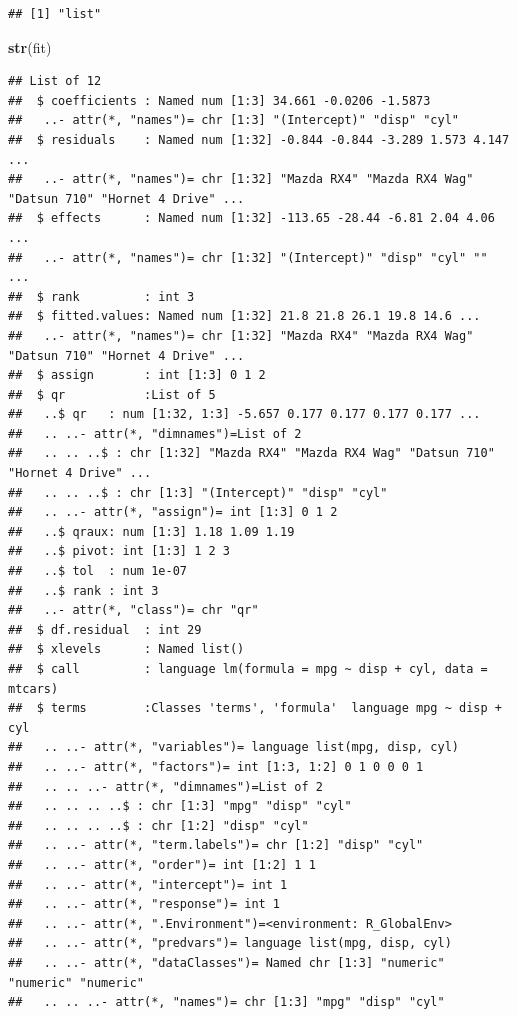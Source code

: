 \documentclass[]{book}
\newenvironment{Shaded}{\begin{snugshade}}{\end{snugshade}}
\newcommand{\KeywordTok}[1]{\textcolor[rgb]{0.13,0.29,0.53}{\textbf{#1}}}
\newcommand{\NormalTok}[1]{#1}
\begin{document}
\begin{verbatim}
## [1] "list"
\end{verbatim}

\begin{Shaded}
\begin{Highlighting}[]
\KeywordTok{str}\NormalTok{(fit)}
\end{Highlighting}
\end{Shaded}

\begin{verbatim}
## List of 12
##  $ coefficients : Named num [1:3] 34.661 -0.0206 -1.5873
##   ..- attr(*, "names")= chr [1:3] "(Intercept)" "disp" "cyl"
##  $ residuals    : Named num [1:32] -0.844 -0.844 -3.289 1.573 4.147 ...
##   ..- attr(*, "names")= chr [1:32] "Mazda RX4" "Mazda RX4 Wag" "Datsun 710" "Hornet 4 Drive" ...
##  $ effects      : Named num [1:32] -113.65 -28.44 -6.81 2.04 4.06 ...
##   ..- attr(*, "names")= chr [1:32] "(Intercept)" "disp" "cyl" "" ...
##  $ rank         : int 3
##  $ fitted.values: Named num [1:32] 21.8 21.8 26.1 19.8 14.6 ...
##   ..- attr(*, "names")= chr [1:32] "Mazda RX4" "Mazda RX4 Wag" "Datsun 710" "Hornet 4 Drive" ...
##  $ assign       : int [1:3] 0 1 2
##  $ qr           :List of 5
##   ..$ qr   : num [1:32, 1:3] -5.657 0.177 0.177 0.177 0.177 ...
##   .. ..- attr(*, "dimnames")=List of 2
##   .. .. ..$ : chr [1:32] "Mazda RX4" "Mazda RX4 Wag" "Datsun 710" "Hornet 4 Drive" ...
##   .. .. ..$ : chr [1:3] "(Intercept)" "disp" "cyl"
##   .. ..- attr(*, "assign")= int [1:3] 0 1 2
##   ..$ qraux: num [1:3] 1.18 1.09 1.19
##   ..$ pivot: int [1:3] 1 2 3
##   ..$ tol  : num 1e-07
##   ..$ rank : int 3
##   ..- attr(*, "class")= chr "qr"
##  $ df.residual  : int 29
##  $ xlevels      : Named list()
##  $ call         : language lm(formula = mpg ~ disp + cyl, data = mtcars)
##  $ terms        :Classes 'terms', 'formula'  language mpg ~ disp + cyl
##   .. ..- attr(*, "variables")= language list(mpg, disp, cyl)
##   .. ..- attr(*, "factors")= int [1:3, 1:2] 0 1 0 0 0 1
##   .. .. ..- attr(*, "dimnames")=List of 2
##   .. .. .. ..$ : chr [1:3] "mpg" "disp" "cyl"
##   .. .. .. ..$ : chr [1:2] "disp" "cyl"
##   .. ..- attr(*, "term.labels")= chr [1:2] "disp" "cyl"
##   .. ..- attr(*, "order")= int [1:2] 1 1
##   .. ..- attr(*, "intercept")= int 1
##   .. ..- attr(*, "response")= int 1
##   .. ..- attr(*, ".Environment")=<environment: R_GlobalEnv> 
##   .. ..- attr(*, "predvars")= language list(mpg, disp, cyl)
##   .. ..- attr(*, "dataClasses")= Named chr [1:3] "numeric" "numeric" "numeric"
##   .. .. ..- attr(*, "names")= chr [1:3] "mpg" "disp" "cyl"

\end{verbatim}
\end{document}
